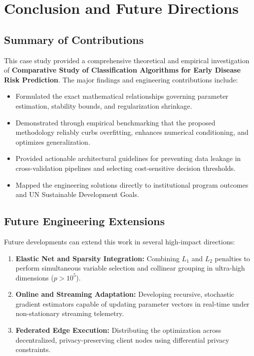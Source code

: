 \section{Conclusion and Future Directions}

\subsection{Summary of Contributions}
This case study provided a comprehensive theoretical and empirical investigation of \textbf{Comparative Study of Classification Algorithms for Early Disease Risk Prediction}. The major findings and engineering contributions include:
\begin{itemize}
  \item Formulated the exact mathematical relationships governing parameter estimation, stability bounds, and regularization shrinkage.
  \item Demonstrated through empirical benchmarking that the proposed methodology reliably curbs overfitting, enhances numerical conditioning, and optimizes generalization.
  \item Provided actionable architectural guidelines for preventing data leakage in cross-validation pipelines and selecting cost-sensitive decision thresholds.
  \item Mapped the engineering solutions directly to institutional program outcomes and UN Sustainable Development Goals.
\end{itemize}

\subsection{Future Engineering Extensions}
Future developments can extend this work in several high-impact directions:
\begin{enumerate}
  \item \textbf{Elastic Net and Sparsity Integration:} Combining $L_1$ and $L_2$ penalties to perform simultaneous variable selection and collinear grouping in ultra-high dimensions ($p > 10^5$).
  \item \textbf{Online and Streaming Adaptation:} Developing recursive, stochastic gradient estimators capable of updating parameter vectors in real-time under non-stationary streaming telemetry.
  \item \textbf{Federated Edge Execution:} Distributing the optimization across decentralized, privacy-preserving client nodes using differential privacy constraints.
\end{enumerate}
